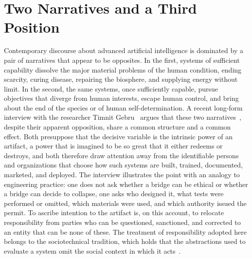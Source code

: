 \chapter{Two Narratives and a Third Position}
\label{ch:01}

Contemporary discourse about advanced artificial intelligence is dominated by a pair of narratives that appear to be opposites. In the first, systems of sufficient capability dissolve the major material problems of the human condition, ending scarcity, curing disease, repairing the biosphere, and supplying energy without limit. In the second, the same systems, once sufficiently capable, pursue objectives that diverge from human interests, escape human control, and bring about the end of the species or of human self-determination. A recent long-form interview with the researcher Timnit Gebru~\cite{interview2026,gebru2024} argues that these two narratives~\cite{bostrom2014,bender2021}, despite their apparent opposition, share a common structure and a common effect. Both presuppose that the decisive variable is the intrinsic power of an artifact, a power that is imagined to be so great that it either redeems or destroys, and both therefore draw attention away from the identifiable persons and organizations that choose how such systems are built, trained, documented, marketed, and deployed. The interview illustrates the point with an analogy to engineering practice: one does not ask whether a bridge can be ethical or whether a bridge can decide to collapse, one asks who designed it, what tests were performed or omitted, which materials were used, and which authority issued the permit. To ascribe intention to the artifact is, on this account, to relocate responsibility from parties who can be questioned, sanctioned, and corrected to an entity that can be none of these. The treatment of responsibility adopted here belongs to the sociotechnical tradition, which holds that the abstractions used to evaluate a system omit the social context in which it acts~\cite{selbst2019}.

